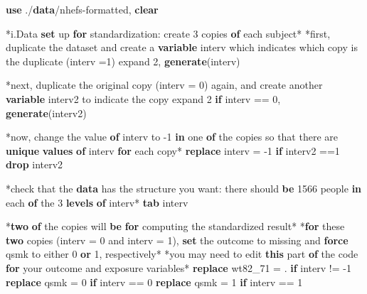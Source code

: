 \documentclass[
  10pt,
]{book}
\newenvironment{Shaded}{\begin{snugshade}}{\end{snugshade}}
\newcommand{\FunctionTok}[1]{\textcolor[rgb]{0.00,0.00,0.00}{#1}}
\newcommand{\KeywordTok}[1]{\textcolor[rgb]{0.13,0.29,0.53}{\textbf{#1}}}
\newcommand{\NormalTok}[1]{#1}
\newcommand{\OtherTok}[1]{\textcolor[rgb]{0.56,0.35,0.01}{#1}}
\begin{document}
\begin{Shaded}
\begin{Highlighting}[]
\KeywordTok{use}\NormalTok{ ./}\KeywordTok{data}\NormalTok{/nhefs{-}formatted, }\KeywordTok{clear}

\NormalTok{*i.Data }\KeywordTok{set}\NormalTok{ up }\KeywordTok{for}\NormalTok{ standardization: create 3 copies }\KeywordTok{of}\NormalTok{ each subject*}
\NormalTok{*first, duplicate the dataset and create a }\KeywordTok{variable}\NormalTok{ \textquotesingle{}interv\textquotesingle{} which indicates which copy is the duplicate (interv =1)}
\NormalTok{expand 2, }\KeywordTok{generate}\NormalTok{(interv)}

\NormalTok{*next, duplicate the original copy (interv = 0) again, and create another }\KeywordTok{variable}\NormalTok{ \textquotesingle{}interv2\textquotesingle{} to indicate the copy}
\NormalTok{expand 2 }\KeywordTok{if}\NormalTok{ interv == 0, }\KeywordTok{generate}\NormalTok{(interv2)}

\NormalTok{*now, change the }\OtherTok{value} \KeywordTok{of}\NormalTok{ \textquotesingle{}interv\textquotesingle{} to {-}1 }\KeywordTok{in}\NormalTok{ one }\KeywordTok{of}\NormalTok{ the copies so that there are }\KeywordTok{unique} \KeywordTok{values} \KeywordTok{of}\NormalTok{ interv }\KeywordTok{for}\NormalTok{ each copy*}
\KeywordTok{replace}\NormalTok{ interv = {-}1  }\KeywordTok{if}\NormalTok{ interv2 ==1}
\KeywordTok{drop}\NormalTok{ interv2 }

\NormalTok{*check that the }\KeywordTok{data}\NormalTok{ has the structure you want: there should }\KeywordTok{be}\NormalTok{ 1566 people }\KeywordTok{in}\NormalTok{ each }\KeywordTok{of}\NormalTok{ the 3 }\KeywordTok{levels} \KeywordTok{of}\NormalTok{ interv*}
\KeywordTok{tab}\NormalTok{ interv}

\NormalTok{*}\KeywordTok{two} \KeywordTok{of}\NormalTok{ the copies will }\KeywordTok{be} \KeywordTok{for}\NormalTok{ computing the standardized result*}
\NormalTok{*}\KeywordTok{for}\NormalTok{ these }\KeywordTok{two}\NormalTok{ copies (interv = 0 and interv = 1), }\KeywordTok{set}\NormalTok{ the outcome to }\FunctionTok{missing}\NormalTok{ and }\KeywordTok{force}\NormalTok{ qsmk to either 0 }\KeywordTok{or}\NormalTok{ 1, respectively*}
\NormalTok{*you may need to edit }\KeywordTok{this}\NormalTok{ part }\KeywordTok{of}\NormalTok{ the code }\KeywordTok{for}\NormalTok{ your outcome and exposure variables*}
\KeywordTok{replace}\NormalTok{ wt82\_71 = . }\KeywordTok{if}\NormalTok{ interv != {-}1}
\KeywordTok{replace}\NormalTok{ qsmk = 0 }\KeywordTok{if}\NormalTok{ interv == 0}
\KeywordTok{replace}\NormalTok{ qsmk = 1 }\KeywordTok{if}\NormalTok{ interv == 1}


\end{Highlighting}
\end{Shaded}
\end{document}
